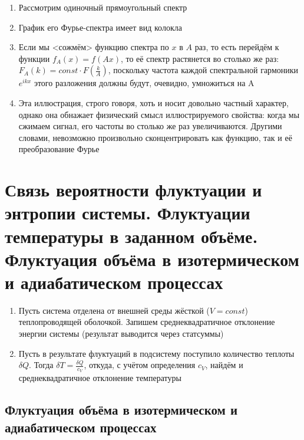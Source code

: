 \documentclass[a4paper, 14pt]{article}
\begin{document}
    \begin{enumerate}
        \item Рассмотрим одиночный прямоугольный спектр
        \item График его Фурье-спектра имеет вид колокла
        \item Если мы <сожмём> функцию спектра по $x$ в $A$ раз, то есть перейдём к функции $f_A(x) = f(Ax)$, то её
        спектр растянется во столько же раз: $F_A(k) = const \cdot F\left(\frac{k}{A}\right)$, поскольку частота каждой
        спектральной
        гармоники $e^{ikx}$ этого разложения должны будут, очевидно, умножиться на A
        \item Эта иллюстрация, строго говоря, хоть и носит довольно частный характер, однако она обнажает
        физический смысл иллюстрируемого свойства: когда мы сжимаем сигнал, его частоты во столько же раз увеличиваются.
        Другими словами, невозможно произвольно сконцентрировать как функцию, так и её преобразование Фурье
    \end{enumerate}
    
    \section{Связь вероятности флуктуации и энтропии системы.
    Флуктуации температуры в заданном объёме.
    Флуктуация объёма в изотермическом и адиабатическом процессах}
    
    \begin{enumerate}
        \item Пусть система отделена от внешней среды жёсткой ($V = const$) теплопроводящей оболочкой.
        Запишем среднеквадратичное отклонение энергии системы (результат выводится через статсуммы)
        \item Пусть в результате флуктуаций в подсистему поступило количество теплоты $\delta Q$.
        Тогда $\delta T = \frac{\delta Q}{c_V}$, откуда, с учётом определения $c_V$, найдём и среднеквадратичное
        отклонение температуры
    \end{enumerate}
    
    \subsection{Флуктуация объёма в изотермическом и адиабатическом процессах}
    
\end{document}
